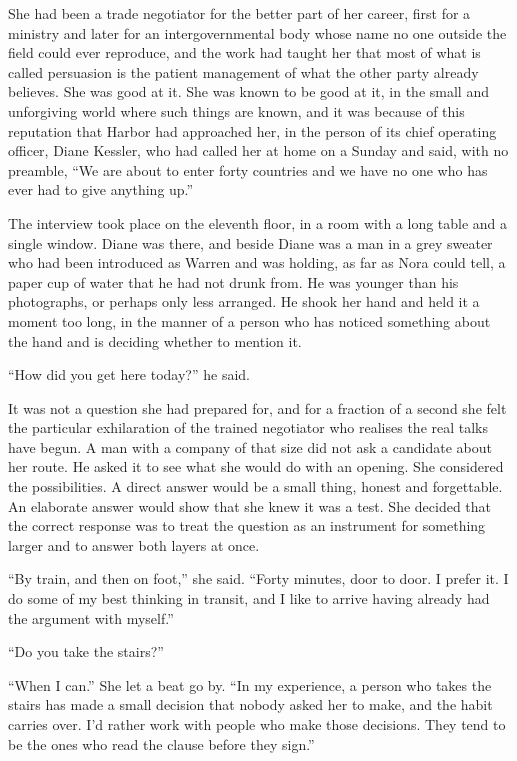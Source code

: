 She had been a trade negotiator for the better part of her career, first for a ministry and later for an intergovernmental body whose name no one outside the field could ever reproduce, and the work had taught her that most of what is called persuasion is the patient management of what the other party already believes. She was good at it. She was known to be good at it, in the small and unforgiving world where such things are known, and it was because of this reputation that Harbor had approached her, in the person of its chief operating officer, Diane Kessler, who had called her at home on a Sunday and said, with no preamble, ``We are about to enter forty countries and we have no one who has ever had to give anything up.''

The interview took place on the eleventh floor, in a room with a long table and a single window. Diane was there, and beside Diane was a man in a grey sweater who had been introduced as Warren and was holding, as far as Nora could tell, a paper cup of water that he had not drunk from. He was younger than his photographs, or perhaps only less arranged. He shook her hand and held it a moment too long, in the manner of a person who has noticed something about the hand and is deciding whether to mention it.

``How did you get here today?'' he said.

It was not a question she had prepared for, and for a fraction of a second she felt the particular exhilaration of the trained negotiator who realises the real talks have begun. A man with a company of that size did not ask a candidate about her route. He asked it to see what she would do with an opening. She considered the possibilities. A direct answer would be a small thing, honest and forgettable. An elaborate answer would show that she knew it was a test. She decided that the correct response was to treat the question as an instrument for something larger and to answer both layers at once.

``By train, and then on foot,'' she said. ``Forty minutes, door to door. I prefer it. I do some of my best thinking in transit, and I like to arrive having already had the argument with myself.''

``Do you take the stairs?''

``When I can.'' She let a beat go by. ``In my experience, a person who takes the stairs has made a small decision that nobody asked her to make, and the habit carries over. I'd rather work with people who make those decisions. They tend to be the ones who read the clause before they sign.''


